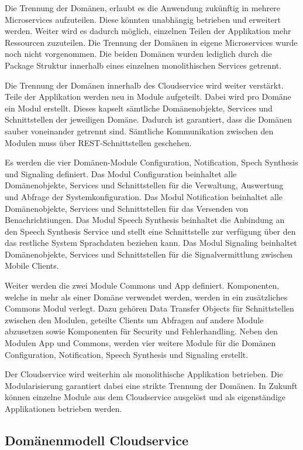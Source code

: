 Die Trennung der Domänen, erlaubt es die Anwendung zukünftig in mehrere Microservices aufzuteilen.
Diese könnten unabhängig betrieben und erweitert werden.
Weiter wird es dadurch möglich, einzelnen Teilen der Applikation mehr Ressourcen zuzuteilen.
Die Trennung der Domänen in eigene Microservices wurde noch nicht vorgenommen.
Die beiden Domänen wurden lediglich durch die Package Struktur innerhalb eines einzelnen monolithischen Services getrennt.

Die Trennung der Domänen innerhalb des Cloudservice wird weiter verstärkt.
Teile der Applikation werden neu in Module aufgeteilt.
Dabei wird pro Domäne ein Modul erstellt.
Dieses kapselt sämtliche Domänenobjekte, Services und Schnittstellen der jeweiligen Domäne.
Dadurch ist garantiert, dass die Domänen sauber voneinander getrennt sind.
Sämtliche Kommunikation zwischen den Modulen muss über REST-Schnittstellen geschehen.

Es werden die vier Domänen-Module Configuration, Notification, Spech Synthesis und Signaling definiert.
Das Modul Configuration beinhaltet alle Domänenobjekte, Services und Schnittstellen für die Verwaltung, Auswertung und Abfrage der Systemkonfiguration.
Das Modul Notification beinhaltet alle Domänenobjekte, Services und Schnittstellen für das Versenden von Benachrichtiungen.
Das Modul Speech Synthesis beinhaltet die Anbindung an den Speech Synthesis Service und stellt eine Schnittstelle zur verfügung über den das restliche System Sprachdaten beziehen kann.
Das Modul Signaling beinhaltet Domänenobjekte, Services und Schnittstellen für die Signalvermittlung zwischen Mobile Clients.

Weiter werden die zwei Module Commons und App definiert.
Komponenten, welche in mehr als einer Domäne verwendet werden, werden in ein zusätzliches Commons Modul verlegt.
Dazu gehören Data Transfer Objects für Schnittstellen zwischen den Modulen, geteilte Clients um Abfragen auf andere Module abzusetzen sowie Komponenten für Security und Fehlerhandling.
Neben den Modulen App und Commons, werden vier weitere Module für die Domänen Configuration, Notification, Speech Synthesis und Signaling erstellt.

Der Cloudservice wird weiterhin als monolithische Applikation betrieben.
Die Modularisierung garantiert dabei eine strikte Trennung der Domänen.
In Zukunft können einzelne Module aus dem Cloudservice ausgelöst und als eigenständige Applikationen betrieben werden.

\clearpage

\subsection{Domänenmodell Cloudservice}

